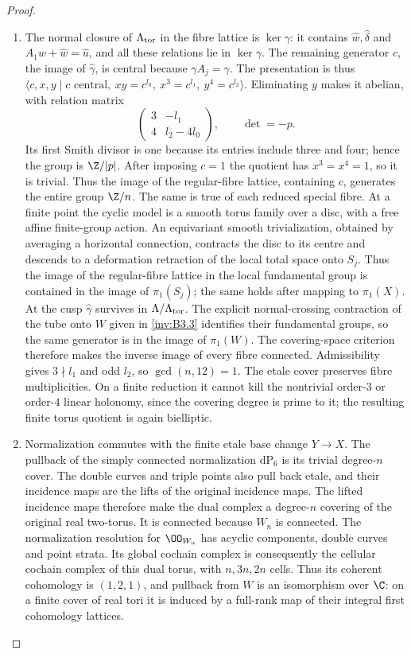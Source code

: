 \begin{proof}
\begin{enumerate}[label=\arabic*.,leftmargin=*]
\item The normal closure of $\Lambda_{\rm tor}$ in the fibre lattice is
$\ker\gamma$: it contains $\hat w,\hat\delta$ and
$A_1\hat w+\hat w=\hat u$, and all these relations lie in
$\ker\gamma$. The remaining generator $c$, the image of
$\hat\gamma$, is central because $\gamma A_j=\gamma$.
The presentation is thus
$\langle c,x,y\mid c\text{ central},\ xy=c^{l_0},\
x^3=c^{l_1},\ y^4=c^{l_2}\rangle$.
Eliminating $y$ makes it abelian, with relation matrix
\[
 \begin{pmatrix}3&-l_1\\4&l_2-4l_0\end{pmatrix},
 \qquad\det=-p.
\]
Its first Smith divisor is one because its entries include three
and four; hence the group is $\Z/|p|$.
After imposing $c=1$ the quotient has $x^3=x^4=1$, so it is trivial.
Thus the image of the regular-fibre lattice, containing $c$, generates
the entire group $\Z/n$. The same is true of each reduced special
fibre. At a finite point the cyclic model is a smooth torus family
over a disc, with a free affine finite-group action. An equivariant
smooth trivialization, obtained by averaging a horizontal connection,
contracts the disc to its centre and descends to a deformation
retraction of the local total space onto $S_j$. Thus the image of
the regular-fibre lattice in the local fundamental group is contained
in the image of $\pi_1(S_j)$; the same holds after mapping to
$\pi_1(X)$. At the cusp $\hat\gamma$ survives in
$\Lambda/\Lambda_{\rm tor}$. The explicit normal-crossing contraction
of the tube onto $W$ given in \ref{inv:B3.3} identifies their fundamental groups,
so the same generator is in the image of $\pi_1(W)$.
The covering-space criterion therefore makes the inverse image of
every fibre connected. Admissibility gives $3\nmid l_1$ and odd $l_2$,
so $\gcd(n,12)=1$. The etale cover preserves fibre multiplicities.
On a finite reduction it cannot kill the nontrivial order-$3$ or
order-$4$ linear holonomy, since the covering degree is prime to it;
the resulting finite torus quotient is again bielliptic.

\item Normalization commutes with the finite etale base change $Y\to X$.
The pullback of the simply connected normalization $\mathrm{dP}_6$
is its trivial degree-$n$ cover. The double curves and triple points
also pull back etale, and their incidence maps are the lifts of the
original incidence maps. The lifted incidence maps therefore make the dual complex a
degree-$n$ covering of the original real two-torus. It is connected because
$W_n$ is connected. The normalization resolution for $\OO_{W_n}$
has acyclic components, double curves and point strata. Its global
cochain complex is consequently the cellular cochain complex of this
dual torus, with $n,3n,2n$ cells. Thus its coherent cohomology is
$(1,2,1)$, and pullback from $W$ is an isomorphism over $\C$:
on a finite cover of real tori it is induced by a full-rank map of
their integral first cohomology lattices.


\end{enumerate}
\end{proof}
